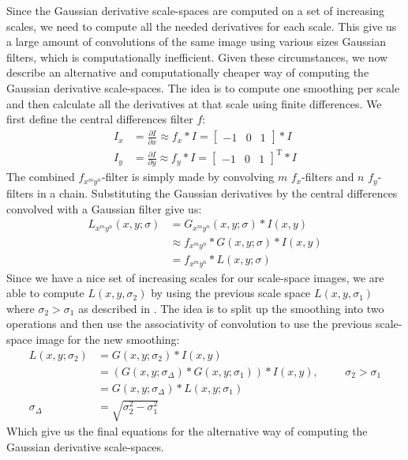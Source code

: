 \documentclass[thesis.tex]{subfiles}
\begin{document}
Since the Gaussian derivative scale-spaces are computed on a set of increasing scales, we need to compute all the needed derivatives for each scale. This give us a large amount of convolutions of the same image using various sizes Gaussian filters, which is computationally inefficient. Given these circumstances, we now describe an alternative and computationally cheaper way of computing the Gaussian derivative scale-spaces. The idea is to compute one smoothing per scale and then calculate all the derivatives at that scale using finite differences. We first define the central differences filter $f$:
%
\begin{align*}
	I_x &= \frac{\partial I}{\partial x} \approx f_x \ast I = \begin{bmatrix} -1 & 0 & 1\end{bmatrix} \ast I \\
	I_y &= \frac{\partial I}{\partial y} \approx f_y \ast I = \begin{bmatrix} -1 & 0 & 1\end{bmatrix}^\text{T} \ast I
\end{align*}
%
The combined $f_{x^m y^n}$-filter is simply made by convolving $m$ $f_x$-filters and $n$ $f_y$-filters in a chain. Substituting the Gaussian derivatives by the central differences convolved with a Gaussian filter give us:
%
\begin{align*}
	L_{x^m y^n}(x,y;\sigma) &= G_{x^m y^n}(x,y;\sigma) \ast I(x,y) \\
		&\approx f_{x^m y^n} \ast G(x,y;\sigma) \ast I(x,y) \\
		&= f_{x^m y^n} \ast L(x,y;\sigma)
\end{align*}
%
Since we have a nice set of increasing scales for our scale-space images, we are able to compute $L(x,y,\sigma_2)$ by using the previous scale space $L(x,y,\sigma_1)$ where $\sigma_2 > \sigma_1$ as described in \cite{tola2008fast}. The idea is to split up the smoothing into two operations and then use the associativity of convolution to use the previous scale-space image for the new smoothing:
%
\begin{align*}
	L(x,y;\sigma_2) &= G(x,y;\sigma_2) \ast I(x,y) \\
					&= (G(x,y;\sigma_\Delta) \ast G(x,y;\sigma_1)) \ast I(x,y),\hspace{1cm}\sigma_2 > \sigma_1 \\
					&= G(x,y;\sigma_\Delta) \ast L(x,y;\sigma_1) \\
			 \sigma_\Delta &= \sqrt{\sigma_2^2 - \sigma_1^2}
\end{align*}
%
Which give us the final equations for the alternative way of computing the Gaussian derivative scale-spaces.
\end{document}
